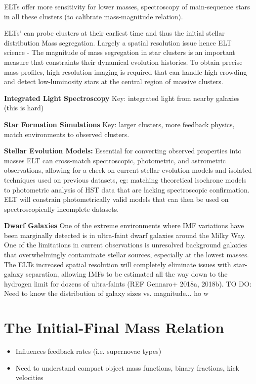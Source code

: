 \documentclass[11pt]{article}
\begin{document}
ELTs offer more sensitivity for lower masses, spectroscopy of main-sequence stars in all these clusters (to calibrate mass-magnitude relation). 

ELTs’ can probe clusters at their earliest time and thus the initial stellar distribution 
Mass segregation. Largely a spatial resolution issue hence ELT science - 
The magnitude of mass segregation in star clusters is an important measure that constraints their dynamical evolution histories. To obtain precise mass profiles, high-resolution imaging is required that can handle high crowding and detect low-luminosity stars at the central region of massive clusters. 

\textbf{Integrated Light Spectroscopy}
Key: integrated light from nearby galaxies (this is hard)

\textbf{Star Formation Simulations}
Key: larger clusters, more feedback physics, match environments to observed clusters.

\textbf{Stellar Evolution Models: }
Essential for converting observed properties into masses
ELT can cross-match spectroscopic, photometric, and astrometric observations, allowing for a check on current stellar evolution models and isolated techniques used on previous datasets, eg: matching theoretical isochrone models to photometric analysis of HST data that are lacking spectroscopic confirmation. ELT will constrain photometrically valid models that can then be used on spectroscopically incomplete datasets.

\textbf{Dwarf Galaxies}
One of the extreme environments where IMF variations have been marginally detected is in ultra-faint dwarf galaxies around the Milky Way. One of the limitations in current observations is unresolved background galaxies that overwhelmingly contaminate stellar sources, especially at the lowest masses.  The ELTs increased spatial resolution will completely eliminate issues with star-galaxy separation, allowing IMFs to be estimated all the way down to the hydrogen limit for dozens of ultra-faints (REF Gennaro+ 2018a, 2018b). TO DO: Need to know the distribution of galaxy sizes vs. magnitude... ho w

\section{The Initial-Final Mass Relation}
\begin{itemize}
\item Influences feedback rates (i.e. supernovae types)
\item Need to understand compact object mass functions, binary fractions, kick velocities
\end{itemize}
\end{document}
